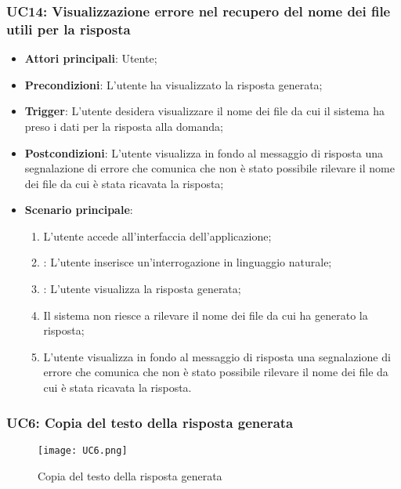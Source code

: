\subsubsection{UC14: Visualizzazione errore nel recupero del nome dei file utili per la risposta}
\begin{itemize}
    \item \textbf{Attori principali}: Utente;
    \item \textbf{Precondizioni}: L'utente ha visualizzato la risposta generata;
    \item \textbf{Trigger}: L'utente desidera visualizzare il nome dei file da cui il sistema ha preso i dati per la risposta alla domanda;
    \item \textbf{Postcondizioni}: L'utente visualizza in fondo al messaggio di risposta una segnalazione di errore che comunica che non è
    stato possibile rilevare il nome dei file da cui è stata ricavata la risposta;
    \item \textbf{Scenario principale}: 
    \begin{enumerate}
        \item L'utente accede all'interfaccia dell'applicazione;
        \item {}: L'utente inserisce un'interrogazione in linguaggio naturale;
        \item {}: L'utente visualizza la risposta generata;
        \item Il sistema non riesce a rilevare il nome dei file da cui ha generato la risposta;
        \item L'utente visualizza in fondo al messaggio di risposta una segnalazione di errore che comunica che non è stato possibile
        rilevare il nome dei file da cui è stata ricavata la risposta.
    \end{enumerate}
\end{itemize}

\newpage

\hypertarget{UC6}{}
\subsubsection{UC6: Copia del testo della risposta generata}

\begin{figure}[h]
    \centering
    \texttt{[image: UC6.png]}
    \caption{Copia del testo della risposta generata}
\end{figure}

